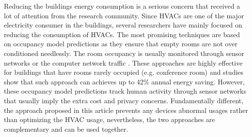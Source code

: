 Reducing the buildings energy consumption is a serious concern that received a lot of attention from the research community.
Since HVACs are one of the major electricity consumer in the buildings, several researchers have mainly focused on reducing the consumption of HVACs.
The most promising techniques are based on occupancy model predictions as they ensure that empty rooms are not over conditioned needlessly.
The room occupancy is usually monitored through sensor networks \cite{agarwal:ipsn2011,erickson:ipsn2011} or the computer network traffic \cite{kim:buildsys2010}.
These approaches are highly effective for buildings that have rooms rarely occupied (e.g. conference room) and studies show that such approach can achieves up to 42\% annual energy saving.
However, these occupancy model predictions track human activity through sensor networks that usually imply the extra cost and privacy concerns.
Fundamentally different, the approach proposed in this article prevents any devices abnormal usages rather than optimizing the HVAC usage, nevertheless, the two approaches are complementary and can be used together.
